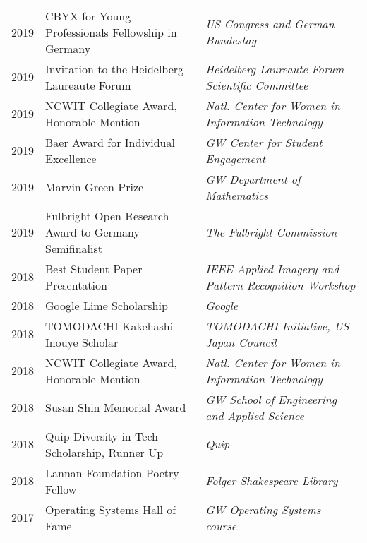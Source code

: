 \documentclass[a4paper,10pt]{article}
\begin{document}
~\begin{tabular}{lll}
2019  & CBYX for Young Professionals Fellowship in Germany  & \textit{US Congress and German Bundestag} \\
2019  & Invitation to the Heidelberg Laureaute Forum & \textit{Heidelberg Laureaute Forum Scientific Committee} \\
2019  & NCWIT Collegiate Award, Honorable Mention & \textit{Natl. Center for Women in Information Technology} \\
2019  & Baer Award for Individual Excellence & \textit{GW Center for Student Engagement} \\
2019  & Marvin Green Prize & \textit{GW Department of Mathematics} \\
2019  & Fulbright Open Research Award to Germany Semifinalist & \textit{The Fulbright Commission} \\
2018  & Best Student Paper Presentation & \textit{IEEE Applied Imagery and Pattern Recognition Workshop} \\
2018  & Google Lime Scholarship & \textit{Google} \\
2018  & TOMODACHI Kakehashi Inouye Scholar & \textit{TOMODACHI Initiative, US-Japan Council} \\
2018  & NCWIT Collegiate Award, Honorable Mention & \textit{Natl. Center for Women in Information Technology} \\
2018  & Susan Shin Memorial Award & \textit{GW School of Engineering and Applied Science} \\
2018  & Quip Diversity in Tech Scholarship, Runner Up & \textit{Quip}\\
2018  & Lannan Foundation Poetry Fellow & \textit{Folger Shakespeare Library} \\
2017  & Operating Systems Hall of Fame  &\textit{GW Operating Systems course} \\


\end{tabular}
\end{document}
